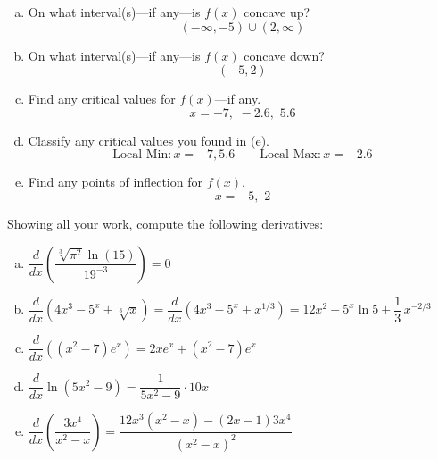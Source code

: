 \documentclass[12pt,letterpaper]{exam}
\begin{document}
\begin{questions}
\begin{enumerate}[(a)]
	\item On what interval(s)---if any---is $f(x)$ concave up? \vfill
		\[
		(-\infty, -5) \cup (2, \infty)
		\] \vfill
	
	\item On what interval(s)---if any---is $f(x)$ concave down? \vfill
		\[
		(-5, 2)
		\] \vfill
	
	\item Find any critical values for $f(x)$---if any. \vfill
		\[
		x= -7, \,\, -2.6, \,\, 5.6
		\] \vfill
	
	\item Classify any critical values you found in (e). \vfill
		\[
		\text{Local Min} \colon x= -7, 5.6 \qquad \text{Local Max} \colon x= -2.6
		\] \vfill
	
	\item Find any points of inflection for $f(x)$. \vfill
		\[
		x= -5, \,\, 2
		\] \vfill
	\end{enumerate}



\newpage
{} \par\vspace{0.3cm}

Showing all your work, compute the following derivatives: \par\vspace{0.3cm}
	\begin{enumerate}[(a)]
	\item $\dfrac{d}{dx} \left( \dfrac{\sqrt[3]{\pi^2} \ln(15)}{19^{-3}} \right)= 0$ \vfill
	\item $\dfrac{d}{dx} \left( 4x^3 - 5^x + \sqrt[3]{x} \right)= \dfrac{d}{dx} \left( 4x^3 - 5^x + x^{1/3} \right)= 12x^2 - 5^x \ln 5 + \dfrac{1}{3}\, x^{-2/3}$ \vfill
	\item $\dfrac{d}{dx} \left( (x^2 - 7) e^x \right)= 2x e^x + (x^2 - 7) e^x$ \vfill
	\item $\dfrac{d}{dx} \ln(5x^2 - 9)= \dfrac{1}{5x^2 - 9} \cdot 10x$ \vfill
	\item $\dfrac{d}{dx} \left( \dfrac{3x^4}{x^2 - x} \right)= \dfrac{12x^3 (x^2 - x) - (2x - 1)3x^4}{(x^2 - x)^2}$ 
	\end{enumerate}



\newpage
{} \par\vspace{0.3cm}


\end{questions}
\end{document}
